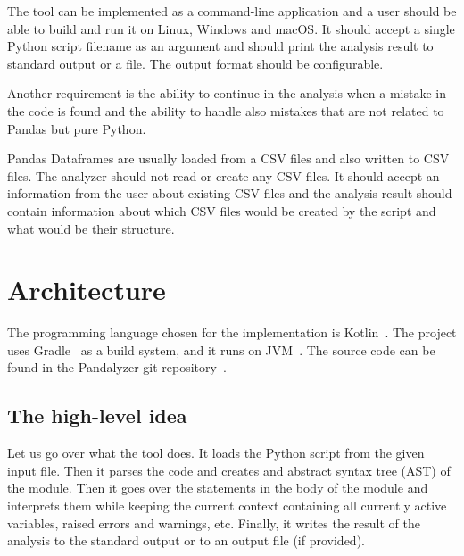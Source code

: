 The tool can be implemented as a command-line application and a user should be able to build and run it on Linux,
Windows and macOS\@.
It should accept a single Python script filename as an argument and should print the analysis result to standard output
or a file.
The output format should be configurable.

Another requirement is the ability to continue in the analysis when a mistake in the code is found and the ability
to handle also mistakes that are not related to Pandas but pure Python. %

Pandas Dataframes are usually loaded from a CSV files and also written to CSV files.
The analyzer should not read or create any CSV files.
It should accept an information from the user about existing CSV files and the analysis result should contain
information about which CSV files would be created by the script and what would be their structure.

\section{Architecture}

The programming language chosen for the implementation is Kotlin~\cite{kotlinDocs}.
The project uses Gradle~\cite{gradleDocs} as a build system, and it runs on JVM~\cite{jvmSpec}\@.
The source code can be found in the Pandalyzer git repository~\cite{pandalyzer}.

\subsection{The high-level idea}

Let us go over what the tool does.
It loads the Python script from the given input file.
Then it parses the code and creates and abstract syntax tree (AST) of the module.
Then it goes over the statements in the body of the module and interprets them while keeping the current context
containing all currently active variables, raised errors and warnings, etc.
Finally, it writes the result of the analysis to the standard output or to an output file (if provided).

